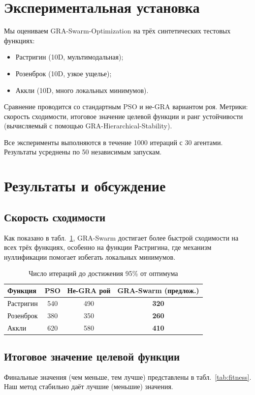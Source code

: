 \documentclass[12pt,a4paper]{article}
\begin{document}
\section{Экспериментальная установка}
Мы оцениваем GRA-Swarm-Optimization на трёх синтетических тестовых функциях:
\begin{itemize}
    \item Растригин (10D, мультимодальная);
    \item Розенброк (10D, узкое ущелье);
    \item Аккли (10D, много локальных минимумов).
\end{itemize}
Сравнение проводится со стандартным PSO и не-GRA вариантом роя. Метрики: скорость сходимости, итоговое значение целевой функции и ранг устойчивости (вычисляемый с помощью GRA-Hierarchical-Stability).

Все эксперименты выполняются в течение 1000 итераций с 30 агентами. Результаты усреднены по 50 независимым запускам.

\section{Результаты и обсуждение}
\subsection{Скорость сходимости}
Как показано в табл.~\ref{tab:convergence}, GRA-Swarm достигает более быстрой сходимости на всех трёх функциях, особенно на функции Растригина, где механизм нуллификации помогает избегать локальных минимумов.

\begin{table}[h]
\centering
\caption{Число итераций до достижения 95\% от оптимума}
\label{tab:convergence}
\begin{tabular}{lccc}
\toprule
Функция & PSO & Не-GRA рой & GRA-Swarm (предлож.) \\
\midrule
Растригин & 540 & 490 & \textbf{320} \\
Розенброк & 380 & 350 & \textbf{260} \\
Аккли & 620 & 580 & \textbf{410} \\
\bottomrule
\end{tabular}
\end{table}

\subsection{Итоговое значение целевой функции}
Финальные значения (чем меньше, тем лучше) представлены в табл.~\ref{tab:fitness}. Наш метод стабильно даёт лучшие (меньшие) значения.
\end{document}
